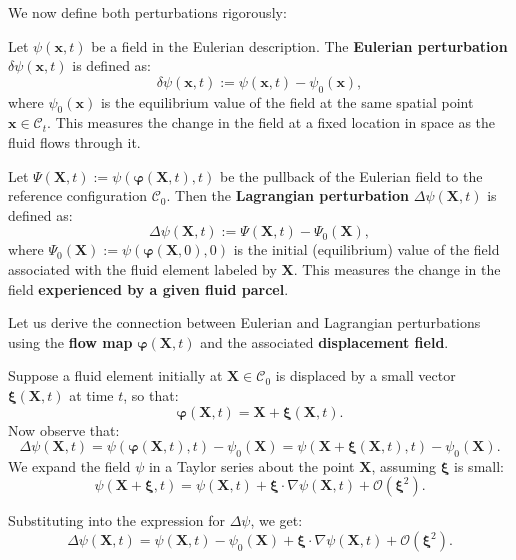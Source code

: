 We now define both perturbations rigorously:

\begin{definition}
Let \( \psi(\mathbf{x}, t) \) be a field in the Eulerian description. The \textbf{Eulerian perturbation} \( \delta \psi(\mathbf{x}, t) \) is defined as:
\[
\delta \psi(\mathbf{x}, t) := \psi(\mathbf{x}, t) - \psi_0(\mathbf{x}),
\]
where \( \psi_0(\mathbf{x}) \) is the equilibrium value of the field at the same spatial point \( \mathbf{x} \in \mathcal{C}_t \). This measures the change in the field at a fixed location in space as the fluid flows through it.
\end{definition}

\begin{definition}
Let \( \Psi(\mathbf{X}, t) := \psi(\boldsymbol{\varphi}(\mathbf{X}, t), t) \) be the pullback of the Eulerian field to the reference configuration \( \mathcal{C}_0 \). Then the \textbf{Lagrangian perturbation} \( \Delta \psi(\mathbf{X}, t) \) is defined as:
\[
\Delta \psi(\mathbf{X}, t) := \Psi(\mathbf{X}, t) - \Psi_0(\mathbf{X}),
\]
where \( \Psi_0(\mathbf{X}) := \psi(\boldsymbol{\varphi}(\mathbf{X}, 0), 0) \) is the initial (equilibrium) value of the field associated with the fluid element labeled by \( \mathbf{X} \). This measures the change in the field \textbf{experienced by a given fluid parcel}.
\end{definition}
\vspace{0.5cm}
Let us derive the connection between Eulerian and Lagrangian perturbations using the \textbf{flow map} \( \boldsymbol{\varphi}(\mathbf{X}, t) \) and the associated \textbf{displacement field}.

Suppose a fluid element initially at \( \mathbf{X} \in \mathcal{C}_0 \) is displaced by a small vector \( \boldsymbol{\xi}(\mathbf{X}, t) \) at time \( t \), so that:
\[
\boldsymbol{\varphi}(\mathbf{X}, t) = \mathbf{X} + \boldsymbol{\xi}(\mathbf{X}, t).
\]
Now observe that:
\[
\Delta \psi(\mathbf{X}, t) = \psi(\boldsymbol{\varphi}(\mathbf{X}, t), t) - \psi_0(\mathbf{X}) = \psi(\mathbf{X} + \boldsymbol{\xi}(\mathbf{X}, t), t) - \psi_0(\mathbf{X}).
\]
We expand the field \( \psi \) in a Taylor series about the point \( \mathbf{X} \), assuming \( \boldsymbol{\xi} \) is small:
\[
\psi(\mathbf{X} + \boldsymbol{\xi}, t) = \psi(\mathbf{X}, t) + \boldsymbol{\xi} \cdot \nabla \psi(\mathbf{X}, t) + \mathcal{O}(\boldsymbol{\xi}^2).
\]

Substituting into the expression for \( \Delta \psi \), we get:
\[
\Delta \psi(\mathbf{X}, t) = \psi(\mathbf{X}, t) - \psi_0(\mathbf{X}) + \boldsymbol{\xi} \cdot \nabla \psi(\mathbf{X}, t) + \mathcal{O}(\boldsymbol{\xi}^2).
\]

